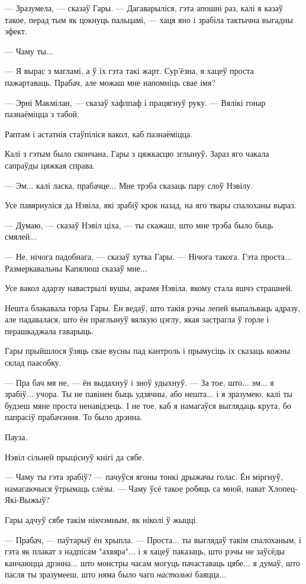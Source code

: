 --- Зразумела, --- сказаў Гары. --- Дагаварыліся, гэта апошні раз, калі я казаў такое, перад тым як
цокнуць пальцамі, --- хаця яно і зрабіла тактычна выгадны эфект.

--- Чаму ты...

--- Я вырас з магламі, а ў іх гэта такі жарт. Сур'ёзна, я хацеў проста пажартаваць.
Прабач, але можаш мне напомніць свае імя?

---  Эрні Макмілан, --- сказаў хафлпаф і працягнуў руку. --- Вялікі гонар пазнаёміцца з табой.

Раптам і астатнія стаўпіліся вакол, каб пазнаёміцца.

Калі з гэтым было скончана, Гары з цяжкасцю зглынуў. Зараз яго чакала сапраўды цяжкая справа.

--- Эм... калі ласка, прабачце... Мне трэба сказаць пару слоў Нэвілу.

Усе павярнуліся да Нэвіла, які зрабіў крок назад, на яго твары спалоханы выраз. 

--- Думаю, --- сказаў Нэвіл ціха, --- ты скажаш, што мне трэба было быць смялей...

--- Не, нічога падобнага, --- сказаў хутка Гары. --- Нічога такога. Гэта проста...
Размеркавальны Капялюш сказаў мне...

Усе вакол адарзу навастрылі вушы, акрамя Нэвіла, якому стала яшчэ страшней.

Нешта блакавала горла Гары. Ён ведаў, што такія рэчы лепей выпальваць адразу, 
але падавалася, што ён праглынуў вялкую цэглу, якая застрагла ў горле і перашкаджала
гаварыць.

Гары прыйшлося ўзяць свае вусны пад кантроль і прымусіць іх сказаць кожны склад 
паасобку.

--- Пра бач мя не, --- ён выдахнуў і зноў удыхнуў. --- За тое, што... эм... я зрабіў...
учора. Ты не павінен быць удзячны, або нешта... і я зразумею, калі ты будзеш мяне проста
ненавідзець. І не тое, каб я намагаўся выглядаць крута, бо папрасіў прабачэння. То было 
дрэнна.

Пауза.

Нэвіл сільней прыціснуў кнігі да сябе.

--- Чаму ты гэта зрабіў? --- пачуўся ягоны тонкі дрыжачы голас. Ён міргнуў,
намагаючыся ўтрымаць слёзы. --- Чаму ўсё такое робяць са мной, нават Хлопец-Які-Выжыў?

Гары адчуў сябе такім нікчэмным, як ніколі ў жыцці. 

--- Прабач, --- паўтарыў ён хрыпла. --- Проста... ты выглядаў такім спалоханым, 
і гэта як плакат з надпісам "ахвяра"... і я хацеў паказаць, што рэчы не заўсёды 
канчаюцца дрэнна... што монстры часам могуць пачаставаць цябе... я думаў, што 
пасля ты зразумееш, што няма было чаго \emph{настолькі} баяцца...

